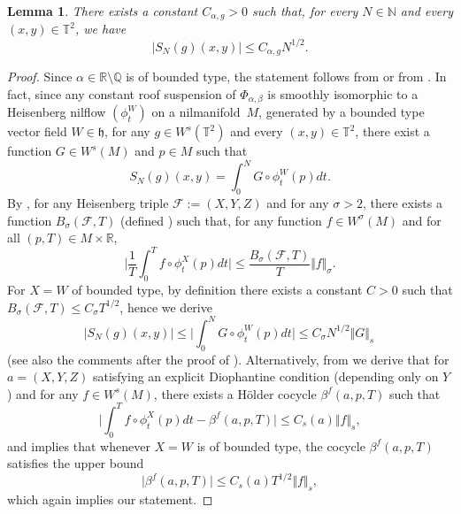 \documentclass[JEP,XML,SOM,Unicode,NoEqCountersInSection]{cedram}
\let\mathcal\mathscr
\theoremstyle{definition}
\theoremstyle{plain}
\newtheorem{lemma}[definition]{Lemma}
\newcommand\NN{\mathbb{N}}
\newcommand\QQ{\mathbb{Q}}
\newcommand\RR{\mathbb{R}}
\newcommand\TT{\mathbb{T}}
\begin{document}
\begin{lemma}\label{lem:upperbound} There exists a constant $C_{\alpha,g}>0$ such that, for every $N\in \NN$ and every $(x,y)\in \TT^2$, we have
\[
|S_{N}(g)(x,y)|\leq C_{\alpha,g}N^{1/2}.
\]
\end{lemma}
\begin{proof} Since $\alpha\in \RR\setminus \QQ$ is of bounded type, the statement follows from \cite[Lem.\,1.4.9]{FoSurvey} or from \cite[Lem.\,6.1 \& Th.\,6.2]{FK}.
In fact, since any constant roof suspension of $\Phi_{\alpha,\beta}$ is smoothly isomorphic to a Heisenberg nilflow $(\phi^W_t)$ on a nilmanifold~$M$, generated by a bounded type vector field $W\in \mathfrak h$, for any $g\in W^s(\TT^2)$ and every $(x,y)\in \TT^2$, there exist a function $G\in W^s(M)$ and $p\in M$ such that
\[
S_{N}(g)(x,y)= \int_0^N G\circ \phi^W_t(p) dt.
\]
By \cite[Lem.\,1.4.9]{FoSurvey}, for any Heisenberg triple $\mathcal F:=(X,Y,Z)$ and for any $\sigma>2$, there exists a function $B_\sigma(\mathcal F,T)$ (defined \cite[Eq.\,(1.71)]{FoSurvey}) such that, for any function $f\in W^\sigma(M)$ and for all $(p,T)\in M\times \RR$,
\[
\biggl\vert \frac{1}{T} \int_0^T f\circ \phi^X_t(p) dt \biggr\vert \leq \frac{ B_\sigma(\mathcal F,T)}{T} \Vert f\Vert_\sigma.
\]
For $X=W$ of bounded type, by definition there exists a constant $C>0$ such that $B_\sigma(\mathcal F,T) \leq C_\sigma T^{1/2}$, hence we derive
\[
\vert S_{N}(g)(x,y) \vert \leq \biggl\vert \int_0^N G\circ \phi^W_t(p) dt \biggr\vert \leq C_\sigma N^{1/2} \Vert G\Vert_s\,
\]
(see also the comments after the proof of \cite[Lem.\,1.4.9]{FoSurvey}). Alternatively, from \cite[Th.\,6.2]{FK} we derive that for
$a=(X,Y,Z)$ satisfying an explicit Diophantine condition (depending only on $Y$) and for any $f\in W^s(M)$, there exists a Hölder cocycle $\beta^f (a, p,T)$ such that
\[
\biggl\vert \int_0^T f\circ \phi^X_t(p) dt - \beta^f (a,p,T)\biggr\vert \leq C_s(a) \Vert f \Vert_s,
\]
and \cite[Lem.\,6.1]{FK} implies that whenever $X=W$ is of bounded type, the cocycle $\beta^f (a, p,T)$ satisfies the upper bound
\[
\vert \beta^f (a, p,T) \vert \leq C_s (a) T^{1/2} \Vert f \Vert_s,
\]
which again implies our statement.
\end{proof}
\end{document}
